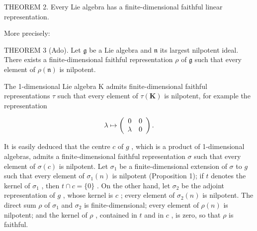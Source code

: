 THEOREM 2. Every Lie algebra has a finite-dimensional faithful linear representation.

More precisely:

THEOREM 3 (Ado). Let \(\mathfrak{g}\) be a Lie algebra and \(\mathfrak{n}\) its largest nilpotent ideal. There exists a finite-dimensional faithful representation \(\rho\) of \(\mathfrak{g}\) such that every element of \(\rho(\mathfrak{n})\) is nilpotent.

The 1-dimensional Lie algebra K admits finite-dimensional faithful representations \(\tau\) such that every element of \(\tau(\mathbf{K})\) is nilpotent, for example the representation

\[
\lambda \mapsto \left( \begin{array}{c c} 0 & 0 \\ \lambda & 0 \end{array} \right).
\]

It is easily deduced that the centre \(c\) of \(g\) , which is a product of 1-dimensional algebras, admits a finite-dimensional faithful representation \(\sigma\) such that every element of \(\sigma(c)\) is nilpotent. Let \(\sigma_1\) be a finite-dimensional extension of \(\sigma\) to \(g\) such that every element of \(\sigma_1(n)\) is nilpotent (Proposition 1); if \(t\) denotes the kernel of \(\sigma_1\) , then \(t \cap c = \{0\}\) . On the other hand, let \(\sigma_2\) be the adjoint representation of \(g\) , whose kernel is \(c\) ; every element of \(\sigma_2(n)\) is nilpotent. The direct sum \(\rho\) of \(\sigma_1\) and \(\sigma_2\) is finite-dimensional; every element of \(\rho(n)\) is nilpotent; and the kernel of \(\rho\) , contained in \(t\) and in \(c\) , is zero, so that \(\rho\) is faithful.

